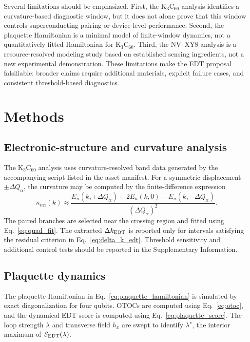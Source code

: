 \documentclass[
  prx,
  reprint,
  superscriptaddress,
  amsmath,
  amssymb,
  aps
]{revtex4-2}
\begin{document}
Several limitations should be emphasized. First, the K$_3$C$_{60}$ analysis identifies a curvature-based diagnostic window, but it does not alone prove that this window controls superconducting pairing or device-level performance. Second, the plaquette Hamiltonian is a minimal model of finite-window dynamics, not a quantitatively fitted Hamiltonian for K$_3$C$_{60}$. Third, the NV--XY8 analysis is a resource-resolved modeling study based on established sensing ingredients, not a new experimental demonstration. These limitations make the EDT proposal falsifiable: broader claims require additional materials, explicit failure cases, and consistent threshold-based diagnostics.

\section{Methods}

\subsection{Electronic-structure and curvature analysis}

The K$_3$C$_{60}$ analysis uses curvature-resolved band data generated by the accompanying script listed in the asset manifest. For a symmetric displacement $\pm\Delta Q_\alpha$, the curvature may be computed by the finite-difference expression
\begin{equation}
\kappa_{n\alpha}(k)
\approx
\frac{E_n(k,+\Delta Q_\alpha)-2E_n(k,0)+E_n(k,-\Delta Q_\alpha)}{(\Delta Q_\alpha)^2}.
\label{eq:finite_difference_curvature}
\end{equation}
The paired branches are selected near the crossing region and fitted using Eq.~\eqref{eq:quad_fit}. The extracted $\Delta k_{\rm EDT}$ is reported only for intervals satisfying the residual criterion in Eq.~\eqref{eq:delta_k_edt}. Threshold sensitivity and additional control tests should be reported in the Supplementary Information.

\subsection{Plaquette dynamics}

The plaquette Hamiltonian in Eq.~\eqref{eq:plaquette_hamiltonian} is simulated by exact diagonalization for four qubits. OTOCs are computed using Eq.~\eqref{eq:otoc}, and the dynamical EDT score is computed using Eq.~\eqref{eq:plaquette_score}. The loop strength $\lambda$ and transverse field $h_x$ are swept to identify $\lambda^\star$, the interior maximum of $S_{\rm EDT}(\lambda)$.
\end{document}
